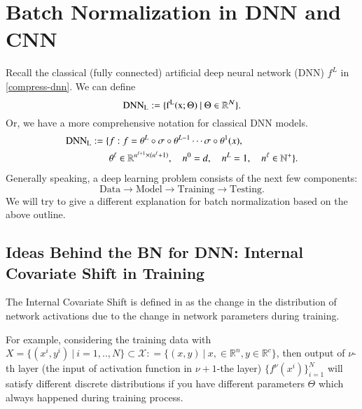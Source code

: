 \newpage
\section{Batch Normalization in DNN and CNN} 
Recall the classical (fully connected)  artificial deep neural network (DNN) $f^L$ in \eqref{compress-dnn}. We can define
\begin{equation}\label{key}
\rm{DNN}_L:= \{  f^L(x;\Theta) ~|~ \Theta \in \mathbb{R}^{\mathcal N} \}.
\end{equation}
Or, we have a more comprehensive notation for classical DNN models.
\begin{equation}\label{eq:DNNdef_J}
\begin{aligned}
{\rm{DNN}_L} :=\{& f:f=
\theta^L \circ \sigma \circ \theta^{L-1} \cdots \sigma \circ \theta^1(x), \\
&\theta^\ell \in \mathbb{R}^{n^{\ell+1} \times (n^\ell+1)}, \quad n^0 = d, \quad n^{L} = 1, \quad n^\ell \in \mathbb{N}^+\}.
\end{aligned}
\end{equation}
Generally speaking, a deep learning problem consists of the next few components:
\begin{equation}\label{DL-process}
\text{Data}  \rightarrow \text{Model} \rightarrow \text{Training} \rightarrow \text{Testing}.
\end{equation}
We will try to give a different explanation for batch normalization based on the above outline.


\subsection{Ideas Behind the BN for DNN: Internal \mbox{Covariate} Shift in Training}
The { Internal Covariate Shift} is defined in \cite{ioffe2015batch} as
the change in the distribution of network activations 
due to the change in network parameters during training.  

For example, considering the training data with 
$X=\{(x^i,y^i)~|~i=1,..,N\}\subset \mathcal{X} : =\{(x,y)~|~x,\in\mathbb{R}^n, y \in \mathbb{R}^c\}$,
then output of $\nu$-th layer (the input of activation function in $\nu+1$-the layer) $\{f^\nu ({x^i}) \}_{i=1}^N$
will satisfy different discrete distributions if you have different parameters $\Theta$ which  
always happened during training process. 

